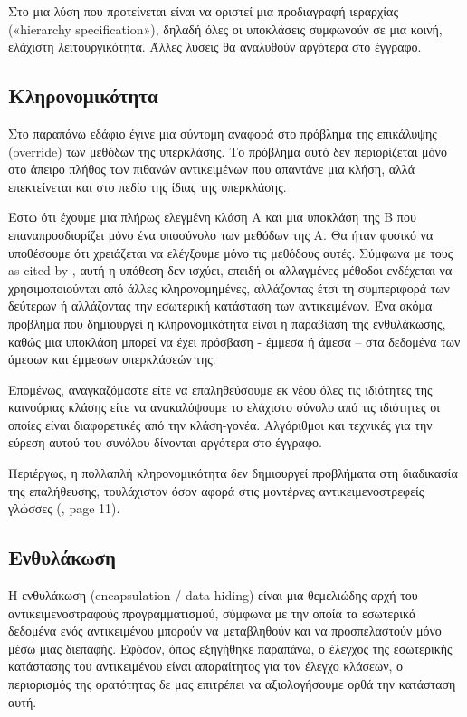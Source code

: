 \documentclass[12pt]{article}
\begin{document}
\par Στο \textcite{chandra} μια λύση που προτείνεται είναι να οριστεί μια προδιαγραφή ιεραρχίας («hierarchy specification»), δηλαδή όλες οι υποκλάσεις συμφωνούν σε μια κοινή, ελάχιστη λειτουργικότητα. Άλλες λύσεις θα αναλυθούν αργότερα στο έγγραφο.

\subsection{Κληρονομικότητα}

Στο παραπάνω εδάφιο έγινε μια σύντομη αναφορά στο πρόβλημα της επικάλυψης (override) των μεθόδων της υπερκλάσης. Το πρόβλημα αυτό δεν περιορίζεται μόνο στο άπειρο πλήθος των πιθανών αντικειμένων που απαντάνε μια κλήση, αλλά επεκτείνεται και στο πεδίο της ίδιας της υπερκλάσης.

\par Έστω ότι έχουμε μια πλήρως ελεγμένη κλάση Α και μια υποκλάση της Β που επαναπροσδιορίζει μόνο ένα υποσύνολο των μεθόδων της Α. Θα ήταν φυσικό να υποθέσουμε ότι χρειάζεται να ελέγξουμε μόνο τις μεθόδους αυτές. Σύμφωνα με τους \textcite{perry} as cited by \textcite{barbey}, αυτή η υπόθεση δεν ισχύει, επειδή οι αλλαγμένες μέθοδοι ενδέχεται να χρησιμοποιούνται από άλλες κληρονομημένες, αλλάζοντας έτσι τη συμπεριφορά των δεύτερων ή αλλάζοντας την εσωτερική κατάσταση των αντικειμένων. Ένα ακόμα πρόβλημα που δημιουργεί η κληρονομικότητα είναι η παραβίαση της ενθυλάκωσης, καθώς μια υποκλάση μπορεί να έχει πρόσβαση - έμμεσα ή άμεσα – στα δεδομένα των άμεσων και έμμεσων υπερκλάσεών της. 

\par Επομένως, αναγκαζόμαστε είτε να επαληθεύσουμε εκ νέου όλες τις ιδιότητες της καινούριας κλάσης είτε να ανακαλύψουμε το ελάχιστο σύνολο από τις ιδιότητες οι οποίες είναι διαφορετικές από την κλάση-γονέα. Αλγόριθμοι και τεχνικές για την εύρεση αυτού του συνόλου δίνονται αργότερα στο έγγραφο.

\par Περιέργως, η πολλαπλή κληρονομικότητα δεν δημιουργεί προβλήματα στη διαδικασία της επαλήθευσης, τουλάχιστον όσον αφορά στις μοντέρνες αντικειμενοστρεφείς γλώσσες (\textcite{barbey}, page 11).

\subsection{Ενθυλάκωση}

Η ενθυλάκωση (encapsulation / data hiding) είναι μια θεμελιώδης αρχή του αντικειμενοστραφούς προγραμματισμού, σύμφωνα με την οποία τα εσωτερικά δεδομένα ενός αντικειμένου μπορούν να μεταβληθούν και να προσπελαστούν μόνο μέσω μιας διεπαφής. Εφόσον, όπως εξηγήθηκε παραπάνω, ο έλεγχος της εσωτερικής κατάστασης του αντικειμένου είναι απαραίτητος για τον έλεγχο κλάσεων, ο περιορισμός της ορατότητας δε μας επιτρέπει να αξιολογήσουμε ορθά την κατάσταση αυτή. 
\end{document}
